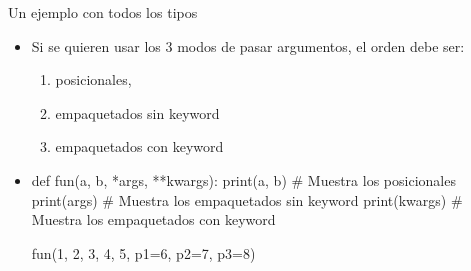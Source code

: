 \documentclass[10pt,envcountsect,spanish]{beamer}
\begin{document}
\begin{frame}[fragile]{Un ejemplo con todos los tipos}

\begin{itemize}

\item Si se quieren usar los 3 modos de pasar argumentos, el orden debe ser:
\begin{enumerate}
\item posicionales,
\item empaquetados sin keyword
\item empaquetados con keyword
\end{enumerate} 

\item[] \unEjemplo

\begin{pyconsole}[][frame=single]
def fun(a, b, *args, **kwargs): 
    print(a, b)   # Muestra los posicionales
    print(args)   # Muestra los empaquetados sin keyword
    print(kwargs) # Muestra los empaquetados con keyword

fun(1, 2, 3, 4, 5, p1=6, p2=7, p3=8)
\end{pyconsole}
\end{itemize}
\end{frame}
\end{document}

